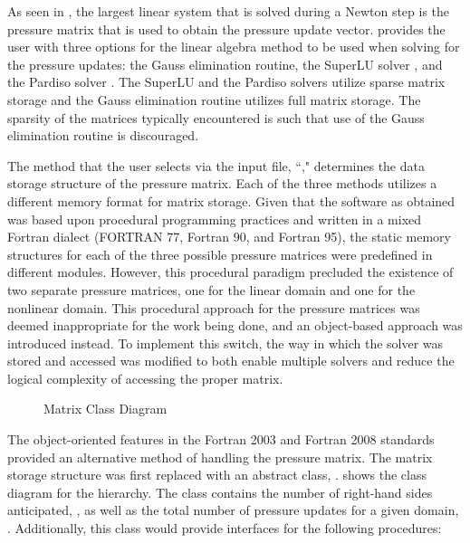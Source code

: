 As seen in , the largest linear system that is solved during a Newton step is the pressure matrix that is used to obtain the pressure update vector.
\cobra{} provides the user with three options for the linear algebra method to be used when solving for the pressure updates: the Gauss elimination routine, the SuperLU solver \cite{Li1999}, and the Pardiso solver \cite{Schenk2006, Schenk2007}.
The SuperLU and the Pardiso solvers utilize sparse matrix storage and the Gauss elimination routine utilizes full matrix storage.
The sparsity of the matrices typically encountered is such that use of the Gauss elimination routine is discouraged.

The method that the user selects via the \cobra{} input file, ``," determines the data storage structure of the pressure matrix.
Each of the three methods utilizes a different memory format for matrix storage.
Given that the software as obtained was based upon procedural programming practices and written in a mixed Fortran dialect (FORTRAN 77, Fortran 90, and Fortran 95), the static memory structures for each of the three possible pressure matrices were predefined in different modules.
However, this procedural paradigm precluded the existence of two separate pressure matrices, one for the linear domain and one for the nonlinear domain.
This procedural approach for the pressure matrices was deemed inappropriate for the work being done, and an object-based approach was introduced instead.
To implement this switch, the way in which the solver was stored and accessed was modified to both enable multiple solvers and reduce the logical complexity of accessing the proper matrix.

\begin{figure}[ht!]
\singlespace\centering

\caption{Matrix Class Diagram}
\label{fig:matrixClassDiagram}
\end{figure}

The object-oriented features in the Fortran 2003 and Fortran 2008 standards provided an alternative method of handling the pressure matrix.
The matrix storage structure was first replaced with an abstract class, .
 shows the class diagram for the  hierarchy.
The  class contains the number of right-hand sides anticipated, , as well as the total number of pressure updates for a given domain, .
Additionally, this class would provide interfaces for the following procedures:

